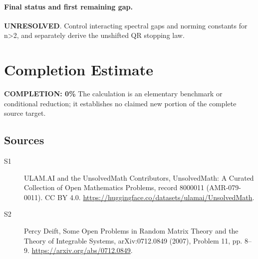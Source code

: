 \documentclass[11pt]{article}
\begin{document}
\paragraph{Final status and first remaining gap.}
\textbf{UNRESOLVED}. Control interacting spectral gaps and norming constants for n>2, and separately derive the unshifted QR stopping law.

\section{Completion Estimate}
\noindent\textbf{COMPLETION: 0\%}
The calculation is an elementary benchmark or conditional reduction; it establishes no claimed new portion of the complete source target.

\subsection{Sources}
\begin{description}
\item[\hypertarget{source:8000011:1}{S1}] ULAM.AI and the UnsolvedMath Contributors, UnsolvedMath: A Curated Collection of Open Mathematics Problems, record 8000011 (AMR-079-0011). CC BY 4.0. \url{https://huggingface.co/datasets/ulamai/UnsolvedMath}.
\item[\hypertarget{source:8000011:2}{S2}] Percy Deift, Some Open Problems in Random Matrix Theory and the Theory of Integrable Systems, arXiv:0712.0849 (2007), Problem 11, pp. 8--9. \url{https://arxiv.org/abs/0712.0849}.
\end{description}
\label{end:8000011}
\end{document}
